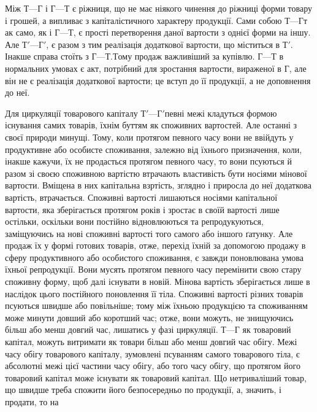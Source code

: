 Між $Т — Г$ і $Г — Т$ є ріжниця, що не має ніякого чинення до ріжниці
форми товару і грошей, а випливає з капіталістичного характеру
продукції. Сами собою $Т — Г т$ак само, як і $Г — Т$, є прості перетворення
даної вартости з однієї форми на іншу. Але $Т' — Г'$, є разом з тим
реалізація додаткової вартости, що міститься в $Т'$. Інакше справа стоїть з
$Г — Т. Т$ому продаж важливіший за купівлю. $Г — Т$ в нормальних умовах
є акт, потрібний для зростання вартости, вираженої в Г, але він не є
реалізація додаткової вартости; це вступ до її продукції, а не доповнення
до неї.

Для циркуляції товарового капіталу $Т' — Г' п$евні межі кладуться
формою існування самих товарів, їхнім буттям як споживних вартостей.
Але останні з своєї природи минущі. Тому, коли протягом певного часу
вони не ввійдуть у продуктивне або особисте споживання, залежно від
їхнього призначення, коли, інакше кажучи, їх не продасться протягом
певного часу, то вони псуються й разом зі своєю споживною вартістю
втрачають властивість бути носіями мінової вартости. Вміщена в них
капітальна взртість, зглядно і приросла до неї додаткова вартість, втрачається.
Споживні вартості лишаються носіями капітальної вартости, яка
зберігається протягом років і зростає в своїй вартості лише остільки,
оскільки вони постійно відновлюються та репродукуються, заміщуючись
на нові споживні вартості того самого або іншого ґатунку. Але продаж
їх у формі готових товарів, отже, перехід їхній за допомогою продажу
в сферу продуктивного або особистого споживання, є завжди поновлювана
умова їхньої репродукції. Вони мусять протягом певного часу
перемінити свою стару споживну форму, щоб далі існувати в новій.
Мінова вартість зберігається лише в наслідок цього постійного поновлення
її тіла. Споживні вартості різних товарів псуються швидше
або повільніше; тому між їхньою продукцією та споживанням може
минути довший або коротший час; отже, вони можуть, не знищуючись
більш або менш довгий час, лишатись у фазі циркуляції. $Т — Г$
як товаровий капітал, можуть витримати як товари більш або менш
довгий час обігу. Межі часу обігу товарового капіталу, зумовлені псуванням
самого товарового тіла, є абсолютні межі цієї частини часу обігу,
або того часу обігу, що протягом його товаровий капітал може існувати
як товаровий капітал. Що нетриваліший товар, що швидше треба
спожити його безпосередньо по продукції, а, значить, і продати, то на
\parbreak{}  %
